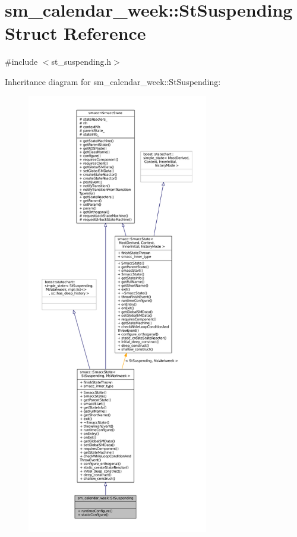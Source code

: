 \hypertarget{structsm__calendar__week_1_1StSuspending}{}\section{sm\+\_\+calendar\+\_\+week\+:\+:St\+Suspending Struct Reference}
\label{structsm__calendar__week_1_1StSuspending}


{\ttfamily \#include $<$st\+\_\+suspending.\+h$>$}



Inheritance diagram for sm\+\_\+calendar\+\_\+week\+:\+:St\+Suspending\+:
\nopagebreak
\begin{figure}[H]
\begin{center}
\leavevmode
\includegraphics[height=550pt]{structsm__calendar__week_1_1StSuspending__inherit__graph}
\end{center}
\end{figure}


